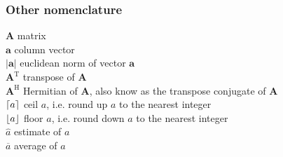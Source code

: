 \subsubsection*{Other nomenclature}


$\bm{A}$ \mytab matrix\\
$\bm{a}$ \mytab column vector\\
$|\bm{a}|$ \mytab euclidean norm of vector $\bm{a}$\\
$\bm{A}^\text{T}$ \mytab transpose of $\bm{A}$\\
$\bm{A}^\text{H}$ \mytab Hermitian of $\bm{A}$, also know as the transpose conjugate of $\bm{A}$\\
$\lceil a\rceil$ \mytab ceil $a$, i.e. round up $a$ to the nearest integer\\
$\lfloor a\rfloor$ \mytab floor $a$, i.e. round down $a$ to the nearest integer \\
$\hat{a}$ \mytab estimate of $a$\\
$\overline{a}$ \mytab average of $a$\\

\clearpage
\thispagestyle{empty}


\cleardoublepage
 \setcounter{page}{1}
\baselineskip 18pt